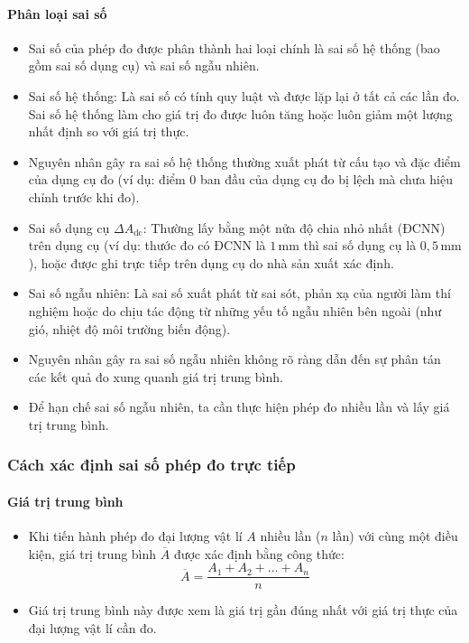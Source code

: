 \paragraph{Phân loại sai số}
\begin{itemize}
\item Sai số của phép đo được phân thành hai loại chính là sai số hệ thống (bao gồm sai số dụng cụ) và sai số ngẫu nhiên.
\item Sai số hệ thống: Là sai số có tính quy luật và được lặp lại ở tất cả các lần đo. Sai số hệ thống làm cho giá trị đo được luôn tăng hoặc luôn giảm một lượng nhất định so với giá trị thực.
\item Nguyên nhân gây ra sai số hệ thống thường xuất phát từ cấu tạo và đặc điểm của dụng cụ đo (ví dụ: điểm 0 ban đầu của dụng cụ đo bị lệch mà chưa hiệu chỉnh trước khi đo).
\item Sai số dụng cụ $\Delta A_{\text{dc}}$: Thường lấy bằng một nửa độ chia nhỏ nhất (ĐCNN) trên dụng cụ (ví dụ: thước đo có ĐCNN là $1\,\mathrm{mm}$ thì sai số dụng cụ là $0,5\,\mathrm{mm}$), hoặc được ghi trực tiếp trên dụng cụ do nhà sản xuất xác định.
\item Sai số ngẫu nhiên: Là sai số xuất phát từ sai sót, phản xạ của người làm thí nghiệm hoặc do chịu tác động từ những yếu tố ngẫu nhiên bên ngoài (như gió, nhiệt độ môi trường biến động).
\item Nguyên nhân gây ra sai số ngẫu nhiên không rõ ràng dẫn đến sự phân tán các kết quả đo xung quanh giá trị trung bình.
\item Để hạn chế sai số ngẫu nhiên, ta cần thực hiện phép đo nhiều lần và lấy giá trị trung bình.
\end{itemize}
\subsubsection{Cách xác định sai số phép đo trực tiếp}
\paragraph{Giá trị trung bình}
\begin{itemize}
\item Khi tiến hành phép đo đại lượng vật lí $A$ nhiều lần ($n$ lần) với cùng một điều kiện, giá trị trung bình $\overline{A}$ được xác định bằng công thức:
\[
\overline{A} = \dfrac{A_1 + A_2 + \dots + A_n}{n}
\]
\item Giá trị trung bình này được xem là giá trị gần đúng nhất với giá trị thực của đại lượng vật lí cần đo.
\end{itemize}
